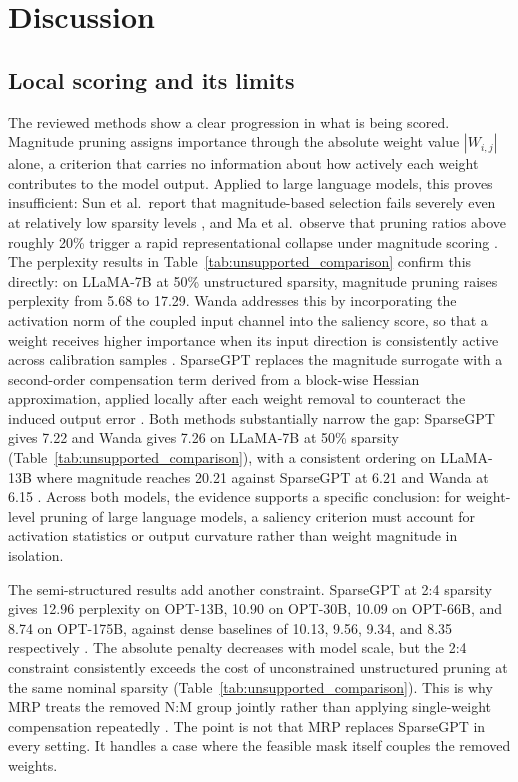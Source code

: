\section{Discussion}
\label{sec:discussion}

\subsection{Local scoring and its limits}
\label{subsec:local_scores_configuration_choices}

The reviewed methods show a clear progression in what is being scored. Magnitude pruning assigns importance through the absolute weight value $|W_{i,j}|$ alone, a criterion that carries no information about how actively each weight contributes to the model output. Applied to large language models, this proves insufficient: Sun et al.\ report that magnitude-based selection fails severely even at relatively low sparsity levels \cite{sun2023simple}, and Ma et al.\ observe that pruning ratios above roughly 20\% trigger a rapid representational collapse under magnitude scoring \cite{ma2023llmpruner}. The perplexity results in Table~\ref{tab:unsupported_comparison} confirm this directly: on LLaMA-7B at 50\% unstructured sparsity, magnitude pruning raises perplexity from 5.68 to 17.29. Wanda addresses this by incorporating the activation norm of the coupled input channel into the saliency score, so that a weight receives higher importance when its input direction is consistently active across calibration samples \cite{sun2023simple}. SparseGPT replaces the magnitude surrogate with a second-order compensation term derived from a block-wise Hessian approximation, applied locally after each weight removal to counteract the induced output error \cite{frantar2023sparsegpt}. Both methods substantially narrow the gap: SparseGPT gives 7.22 and Wanda gives 7.26 on LLaMA-7B at 50\% sparsity (Table~\ref{tab:unsupported_comparison}), with a consistent ordering on LLaMA-13B where magnitude reaches 20.21 against SparseGPT at 6.21 and Wanda at 6.15 \cite{frantar2023sparsegpt,sun2023simple}. Across both models, the evidence supports a specific conclusion: for weight-level pruning of large language models, a saliency criterion must account for activation statistics or output curvature rather than weight magnitude in isolation.

The semi-structured results add another constraint. SparseGPT at 2:4 sparsity gives 12.96 perplexity on OPT-13B, 10.90 on OPT-30B, 10.09 on OPT-66B, and 8.74 on OPT-175B, against dense baselines of 10.13, 9.56, 9.34, and 8.35 respectively \cite{frantar2023sparsegpt}. The absolute penalty decreases with model scale, but the 2:4 constraint consistently exceeds the cost of unconstrained unstructured pruning at the same nominal sparsity (Table~\ref{tab:unsupported_comparison}). This is why MRP treats the removed N:M group jointly rather than applying single-weight compensation repeatedly \cite{zhao2024pruning}. The point is not that MRP replaces SparseGPT in every setting. It handles a case where the feasible mask itself couples the removed weights.

